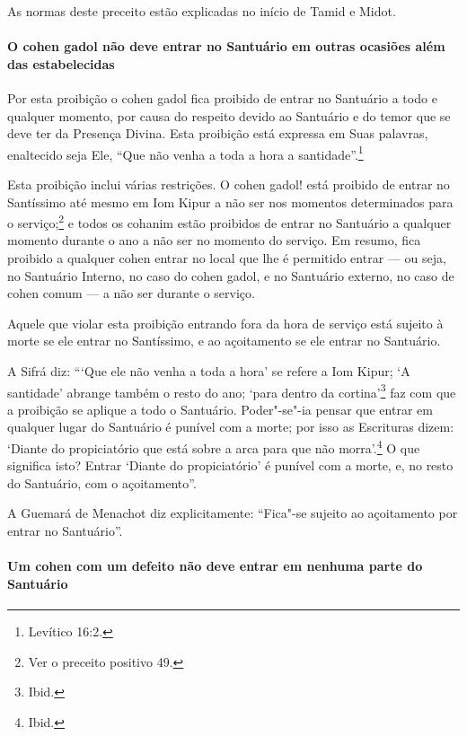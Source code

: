 \begin{multicols}{2}
As normas deste preceito estão explicadas no início de Tamid\starr{} e Midot\starr.

\paragraph{O cohen gadol\starr{} não deve entrar no Santuário em outras ocasiões além das estabelecidas}

Por esta proibição o cohen gadol\starr{} fica proibido de entrar no
Santuário a todo e qualquer momento, por causa do respeito devido ao
Santuário e do temor que se deve ter da Presença Divina. Esta proibição
está expressa em Suas palavras, enaltecido seja Ele, ``Que não venha a
toda a hora a santidade''.\footnote{Levítico 16:2.}

Esta proibição inclui várias restrições. O cohen gadol\starr! está
proibido de entrar no Santíssimo até mesmo em Iom Kipur\starr{} a não ser
nos momentos determinados para o serviço;\footnote{Ver o preceito positivo 49.} e todos
os cohanim\starr{} estão proibidos de entrar no Santuário a qualquer
momento durante o ano a não ser no momento do serviço. Em resumo, fica
proibido a qualquer cohen\starr{} entrar no local que lhe é permitido entrar
--- ou seja, no Santuário Interno, no caso do cohen gadol\starr, e no
Santuário externo, no caso de cohen\starr{} comum --- a não ser durante o
serviço.

Aquele que violar esta proibição entrando fora da hora de serviço está
sujeito à morte se ele entrar no Santíssimo, e ao açoitamento se ele
entrar no Santuário.

A Sifrá\starr{} diz: ```Que ele não venha a toda a hora' se refere a Iom
Kipur\starr; `A santidade' abrange também o resto do ano; `para dentro da
cortina'\footnote{Ibid.} faz com que a proibição se aplique a todo o Santuário.
Poder"-se"-ia pensar que entrar em qualquer lugar do Santuário é punível
com a morte; por isso as Escrituras dizem: `Diante do propiciatório que
está sobre a arca para que não morra'.\footnote{Ibid.} O que significa isto?
Entrar `Diante do propiciatório' é punível com a morte, e, no resto do
Santuário, com o açoitamento''.

A Guemará\starr{} de Menachot\starr{} diz explicitamente: ``Fica"-se sujeito ao
açoitamento por entrar no Santuário''.

\paragraph{Um cohen\starr{} com um defeito não deve entrar em nenhuma parte do
Santuário}


\end{multicols}
